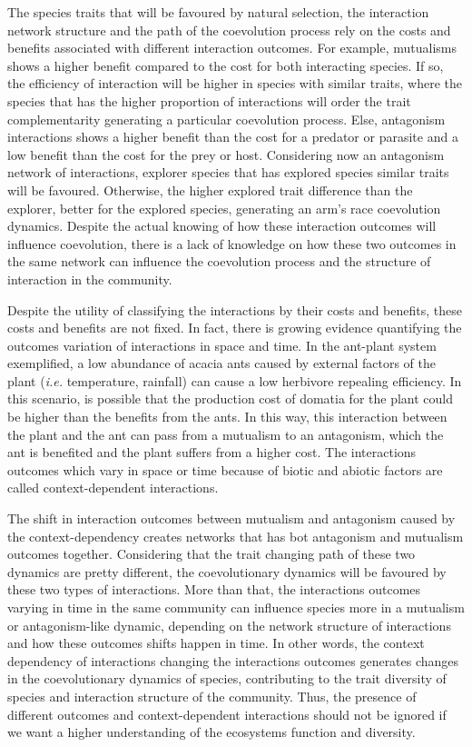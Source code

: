\documentclass[a4paper, 12pt]{article}
\begin{document}
The species traits that will be favoured by natural selection, the interaction network structure and the path of the coevolution process rely on the costs and benefits associated with different interaction outcomes. For example, mutualisms shows a higher benefit compared to the cost for both interacting species. If so, the efficiency of interaction will be higher in species with similar traits, where the species that has the higher proportion of interactions will order the trait complementarity generating a particular coevolution process. Else, antagonism interactions shows a higher benefit than the cost for a predator or parasite and a low benefit than the cost for the prey or host. Considering now an antagonism network of interactions, explorer species that has explored species similar traits will be favoured. Otherwise, the higher explored trait difference than the explorer, better for the explored species, generating an arm's race coevolution dynamics. Despite the actual knowing of how these interaction outcomes will influence coevolution, there is a lack of knowledge on how these two outcomes in the same network can influence the coevolution process and the structure of interaction in the community.

Despite the utility of classifying the interactions by their costs and benefits, these costs and benefits are not fixed. In fact, there is growing evidence quantifying the outcomes variation of interactions in space and time. In the ant-plant system exemplified, a low abundance of acacia ants caused by external factors of the plant (\textit{i.e.} temperature, rainfall) can cause a low herbivore repealing efficiency. In this scenario, is possible that the production cost of domatia for the plant could be higher than the benefits from the ants. In this way, this interaction between the plant and the ant can pass from a mutualism to an antagonism, which the ant is benefited and the plant suffers from a higher cost. The interactions outcomes which vary in space or time because of biotic and abiotic factors are called context-dependent interactions.

The shift in interaction outcomes between mutualism and antagonism caused by the context-dependency creates networks that has bot antagonism and mutualism outcomes together. Considering that the trait changing path of these two dynamics are pretty different, the coevolutionary dynamics will be favoured by these two types of interactions. More than that, the interactions outcomes varying in time in the same community can influence species more in a mutualism or antagonism-like dynamic, depending on the network structure of interactions and how these outcomes shifts happen in time. In other words, the context dependency of interactions changing the interactions outcomes generates changes in the coevolutionary dynamics of species, contributing to the trait diversity of species and interaction structure of the community. Thus, the presence of different outcomes and context-dependent interactions should not be ignored if we want a higher understanding of the ecosystems function and diversity.
\end{document}
